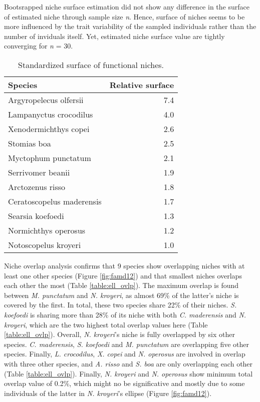 Bootsrapped niche surface estimation did not show any difference in the surface of estimated niche through sample size \textit{n}. Hence, surface of niches seems to be more influenced by the trait variability of the sampled individuals rather than the number of inviduals itself. Yet, estimated niche surface value are tightly converging for \textit{n} = 30. 

\begin{table}[!htbp]
\centering
\caption[Standardized surface of functional niches]{Standardized surface of functional niches.}
\label{table:sp_surface}
\begin{adjustbox}{max width=1.1\textwidth,center}
\begin{tabular}{lr}
  \hline
Species & Relative surface \\ 
  \hline
Argyropelecus olfersii & 7.4 \\ 
  Lampanyctus crocodilus & 4.0 \\ 
  Xenodermichthys copei & 2.6 \\ 
  Stomias boa & 2.5 \\ 
  Myctophum punctatum & 2.1 \\ 
  Serrivomer beanii & 1.9 \\ 
  Arctozenus risso & 1.8 \\ 
  Ceratoscopelus maderensis & 1.7 \\ 
  Searsia koefoedi & 1.3 \\ 
  Normichthys operosus & 1.2 \\ 
  Notoscopelus kroyeri & 1.0 \\ 
   \hline
\end{tabular}
\end{adjustbox}
\end{table}

Niche overlap analysis confirms that 9 species show overlapping niches with at least one other species (Figure \ref{fig:famd12}) and that smallest niches overlaps each other the most (Table \ref{table:ell_ovlp}). The maximum  overlap is found between \textit{M. punctatum} and \textit{N. kroyeri}, as almost 69\% of the latter's niche is covered by the first. In total, these two species share 22\% of their niches. \textit{S. koefoedi} is sharing more than 28\% of its niche with both \textit{C. maderensis} and \textit{N. kroyeri}, which are the two highest total overlap values here (Table \ref{table:ell_ovlp}). Overall, \textit{N. kroyeri}'s niche is fully overlapped by six other species. \textit{C. maderensis}, \textit{S. koefoedi} and \textit{M. punctatum} are overlapping five other species. Finally, \textit{L. crocodilus}, \textit{X. copei} and \textit{N. operosus} are involved in overlap with three other species, and \textit{A. risso} and \textit{S. boa} are only overlapping each other (Table \ref{table:ell_ovlp}). Finally, \textit{N. kroyeri} and \textit{N. operosus} show minimum total overlap value of 0.2\%, which might no be significative and mostly due to some individuals of the latter in \textit{N. kroyeri}'s ellipse (Figure \ref{fig:famd12}). 

